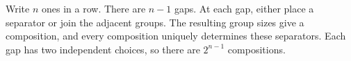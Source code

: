 Write $n$ ones in a row. There are $n-1$ gaps. At each gap, either place a separator or join the adjacent groups. The resulting group sizes give a composition, and every composition uniquely determines these separators. Each gap has two independent choices, so there are $\boxed{2^{n-1}}$ compositions.

